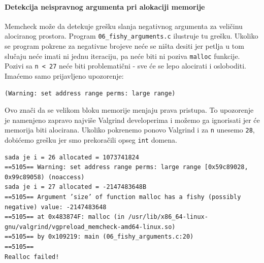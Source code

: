 \paragraph{Detekcija neispravnog argumenta pri alokaciji memorije}\label{detekcija-neispravnog-argumenta-pri-alokaciji-memorije}

Memcheck može da detekuje grešku slanja negativnog argumenta za veličinu alociranog prostora. Program \texttt{06\_fishy\_arguments.c} ilustruje tu grešku. Ukoliko se program pokrene za negativne brojeve neće se ništa desiti jer petlja u tom slučaju neće imati ni jednu iteraciju, pa neće biti ni poziva \texttt{malloc} funkcije. Pozivi sa \texttt{n\ \textless{}\ 27} neće biti problematični - sve će se lepo alocirati i osloboditi. Imaćemo samo prijavljeno upozorenje:

\begin{verbatim}
(Warning: set address range perms: large range)
\end{verbatim}

Ovo znači da se velikom bloku memorije menjaju prava pristupa. To upozorenje je namenjeno zapravo najviše Valgrind developerima i možemo ga ignorisati jer će memorija biti alocirana. Ukoliko pokrenemo ponovo Valgrind i za \texttt{n} unesemo \texttt{28}, dobićemo grešku jer smo prekoračili opseg \texttt{int} domena.

\begin{verbatim}
sada je i = 26 allocated = 1073741824
==5105== Warning: set address range perms: large range [0x59c89028, 0x99c89058) (noaccess)
sada je i = 27 allocated = -2147483648B
==5105== Argument ’size’ of function malloc has a fishy (possibly negative) value: -2147483648
==5105== at 0x483874F: malloc (in /usr/lib/x86_64-linux-gnu/valgrind/vgpreload_memcheck-amd64-linux.so)
==5105== by 0x109219: main (06_fishy_arguments.c:20)
==5105==
Realloc failed!
\end{verbatim}
